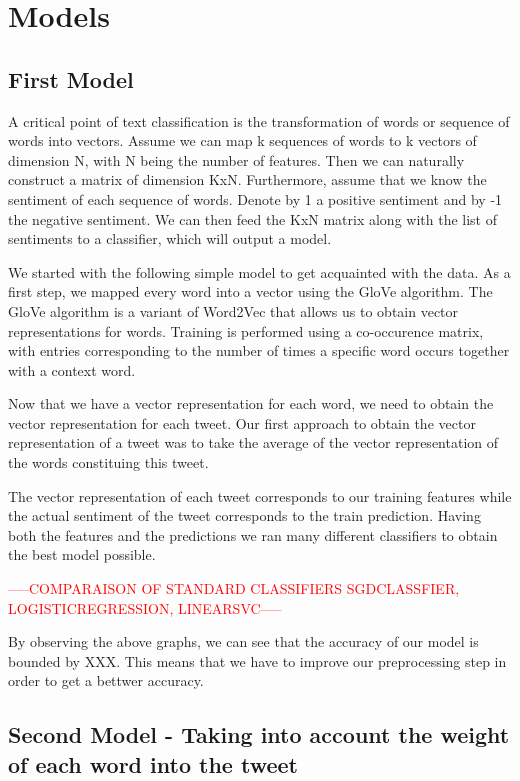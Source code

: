 \documentclass[10pt,conference,compsocconf]{IEEEtran}
\begin{document}
\section{Models}

\subsection{First Model}

A critical point of text classification is the transformation of words or sequence of words into vectors.
Assume we can map k sequences of words to k vectors of dimension N, with N being the number of features. Then we can naturally construct a matrix of dimension KxN.
Furthermore, assume that we know the sentiment of each sequence of words. Denote by 1 a positive sentiment and by -1 the negative sentiment.
We can then feed the KxN matrix along with the list of sentiments to a classifier, which will output a model.

We started with the following simple model to get acquainted with the data. As a first step, we mapped every word into a vector using the GloVe algorithm. The GloVe algorithm is a variant of Word2Vec that allows us to obtain vector representations for words. Training is performed using a co-occurence matrix, with entries corresponding to the number of times a specific word occurs together with a context word.

Now that we have a vector representation for each word, we need to obtain the vector representation for each tweet.
Our first approach to obtain the vector representation of a tweet was to take the average of the vector representation of the words constituing this tweet.

The vector representation of each tweet corresponds to our training features while the actual sentiment of the tweet corresponds to the train prediction.
Having both the features and the predictions we ran many different classifiers to obtain the best model possible.

\begin{center}\textcolor{red}{-----COMPARAISON OF STANDARD CLASSIFIERS
SGDCLASSFIER, LOGISTICREGRESSION, LINEARSVC-----}\end{center}

By observing the above graphs, we can see that the accuracy of our model is bounded by XXX.
This means that we have to improve our preprocessing step in order to get a bettwer accuracy.

\subsection{Second Model - Taking into account the weight of each word into the tweet}
\end{document}
